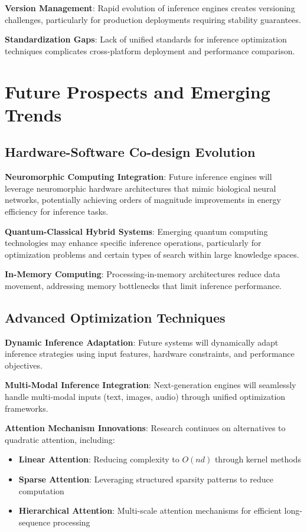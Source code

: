 \documentclass[12pt,a4paper]{article}
\begin{document}
\textbf{Version Management}: Rapid evolution of inference engines creates versioning challenges, particularly for production deployments requiring stability guarantees.

\textbf{Standardization Gaps}: Lack of unified standards for inference optimization techniques complicates cross-platform deployment and performance comparison.

\section{Future Prospects and Emerging Trends}
\subsection{Hardware-Software Co-design Evolution}
\textbf{Neuromorphic Computing Integration}: Future inference engines will leverage neuromorphic hardware architectures that mimic biological neural networks, potentially achieving orders of magnitude improvements in energy efficiency for inference tasks.

\textbf{Quantum-Classical Hybrid Systems}: Emerging quantum computing technologies may enhance specific inference operations, particularly for optimization problems and certain types of search within large knowledge spaces.

\textbf{In-Memory Computing}: Processing-in-memory architectures reduce data movement, addressing memory bottlenecks that limit inference performance.

\subsection{Advanced Optimization Techniques}
\textbf{Dynamic Inference Adaptation}: Future systems will dynamically adapt inference strategies using input features, hardware constraints, and performance objectives.

\textbf{Multi-Modal Inference Integration}: Next-generation engines will seamlessly handle multi-modal inputs (text, images, audio) through unified optimization frameworks.

\textbf{Attention Mechanism Innovations}: Research continues on alternatives to quadratic attention, including:
\begin{itemize}
    \item \textbf{Linear Attention}: Reducing complexity to $O(nd)$ through kernel methods
    \item \textbf{Sparse Attention}: Leveraging structured sparsity patterns to reduce computation
    \item \textbf{Hierarchical Attention}: Multi-scale attention mechanisms for efficient long-sequence processing
\end{itemize}
\end{document}
